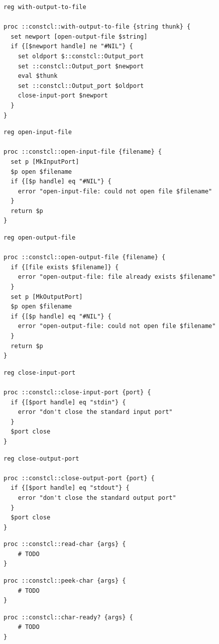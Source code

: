 \documentclass[twoside,9pt]{report}
\begin{document}
\noindent\makebox[\linewidth]{\rule{\linewidth}{0.4pt}}
\noindent\makebox[\linewidth]{\rule{\linewidth}{0.4pt}}
\begin{lstlisting}
reg with-output-to-file
 
proc ::constcl::with-output-to-file {string thunk} {
  set newport [open-output-file $string]
  if {[$newport handle] ne "#NIL"} {
    set oldport $::constcl::Output_port
    set ::constcl::Output_port $newport
    eval $thunk
    set ::constcl::Output_port $oldport
    close-input-port $newport
  }
}
\end{lstlisting}
\noindent\makebox[\linewidth]{\rule{\linewidth}{0.4pt}}
\noindent\makebox[\linewidth]{\rule{\linewidth}{0.4pt}}
\begin{lstlisting}
reg open-input-file
 
proc ::constcl::open-input-file {filename} {
  set p [MkInputPort]
  $p open $filename
  if {[$p handle] eq "#NIL"} {
    error "open-input-file: could not open file $filename"
  }
  return $p
}
\end{lstlisting}
\noindent\makebox[\linewidth]{\rule{\linewidth}{0.4pt}}
\noindent\makebox[\linewidth]{\rule{\linewidth}{0.4pt}}
\begin{lstlisting}
reg open-output-file
 
proc ::constcl::open-output-file {filename} {
  if {[file exists $filename]} {
    error "open-output-file: file already exists $filename"
  }
  set p [MkOutputPort]
  $p open $filename
  if {[$p handle] eq "#NIL"} {
    error "open-output-file: could not open file $filename"
  }
  return $p
}
\end{lstlisting}
\noindent\makebox[\linewidth]{\rule{\linewidth}{0.4pt}}
\noindent\makebox[\linewidth]{\rule{\linewidth}{0.4pt}}
\begin{lstlisting}
reg close-input-port
 
proc ::constcl::close-input-port {port} {
  if {[$port handle] eq "stdin"} {
    error "don't close the standard input port"
  }
  $port close
}
\end{lstlisting}
\noindent\makebox[\linewidth]{\rule{\linewidth}{0.4pt}}
\noindent\makebox[\linewidth]{\rule{\linewidth}{0.4pt}}
\begin{lstlisting}
reg close-output-port
 
proc ::constcl::close-output-port {port} {
  if {[$port handle] eq "stdout"} {
    error "don't close the standard output port"
  }
  $port close
}
\end{lstlisting}
\noindent\makebox[\linewidth]{\rule{\linewidth}{0.4pt}}
\noindent\makebox[\linewidth]{\rule{\linewidth}{0.4pt}}
\begin{lstlisting}
proc ::constcl::read-char {args} {
    # TODO
}
\end{lstlisting}
\noindent\makebox[\linewidth]{\rule{\linewidth}{0.4pt}}
\noindent\makebox[\linewidth]{\rule{\linewidth}{0.4pt}}
\begin{lstlisting}
proc ::constcl::peek-char {args} {
    # TODO
}
\end{lstlisting}
\noindent\makebox[\linewidth]{\rule{\linewidth}{0.4pt}}
\noindent\makebox[\linewidth]{\rule{\linewidth}{0.4pt}}
\begin{lstlisting}
proc ::constcl::char-ready? {args} {
    # TODO
}
\end{lstlisting}
\noindent\makebox[\linewidth]{\rule{\linewidth}{0.4pt}}
\end{document}
